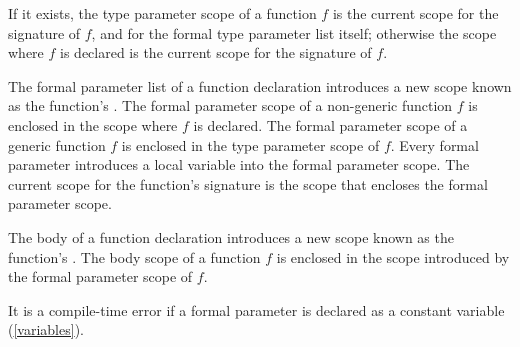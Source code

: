 \documentclass[makeidx]{article}
\begin{document}
\LMHash{}%
If it exists, the type parameter scope of a function $f$ is the current scope for the signature of $f$, and for the formal type parameter list itself;
otherwise the scope where $f$ is declared is the current scope for the signature of $f$.


\LMHash{}%
The formal parameter list of a function declaration introduces a new scope known as the function's
.
The formal parameter scope of a non-generic function $f$ is enclosed in the scope where $f$ is declared.
The formal parameter scope of a generic function $f$ is enclosed in the type parameter scope of $f$.
Every formal parameter introduces a local variable into the formal parameter scope.
The current scope for the function's signature is the scope that encloses the formal parameter scope.


\LMHash{}%
The body of a function declaration introduces a new scope known as the function's
.
The body scope of a function $f$ is enclosed in the scope introduced by the formal parameter scope of $f$.



\LMHash{}%
It is a compile-time error if a formal parameter is declared as a constant variable (\ref{variables}).
\end{document}
